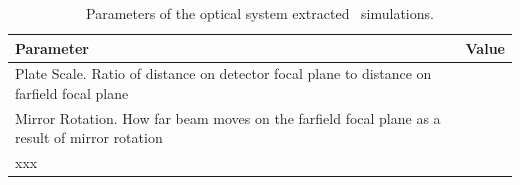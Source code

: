 \begin{table}[ht]
\centering
\caption{
  Parameters of the optical system extracted \ZEMAX\ simulations.
}
\label{tab:ch4-zemax-parms}
\begin{tabular}{p{5in}l}
\toprule
Parameter & Value \\
\midrule
Plate Scale. Ratio of distance on detector focal plane to distance on farfield focal plane & \\
Mirror Rotation. How far beam moves on the farfield focal plane as a result of mirror rotation & \\
xxx &  \\
\bottomrule
\end{tabular}
\end{table}


